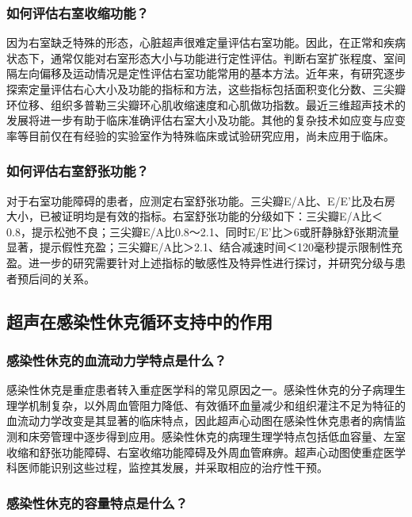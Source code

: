 \subsubsection{如何评估右室收缩功能？}

因为右室缺乏特殊的形态，心脏超声很难定量评估右室功能。因此，在正常和疾病状态下，通常仅能对右室形态大小与功能进行定性评估。判断右室扩张程度、室间隔左向偏移及运动情况是定性评估右室功能常用的基本方法。近年来，有研究逐步探索定量评估右心大小及功能的指标和方法，这些指标包括面积变化分数、三尖瓣环位移、组织多普勒三尖瓣环心肌收缩速度和心肌做功指数。最近三维超声技术的发展将进一步有助于临床准确评估右室大小及功能。其他的复杂技术如应变与应变率等目前仅在有经验的实验室作为特殊临床或试验研究应用，尚未应用于临床。

\subsubsection{如何评估右室舒张功能？}

对于右室功能障碍的患者，应测定右室舒张功能。三尖瓣E/A比、E/E'比及右房大小，已被证明均是有效的指标。右室舒张功能的分级如下：三尖瓣E/A比＜0.8，提示松弛不良；三尖瓣E/A比0.8～2.1、同时E/E'比＞6或肝静脉舒张期流量显著，提示假性充盈；三尖瓣E/A比＞2.1、结合减速时间＜120毫秒提示限制性充盈。进一步的研究需要针对上述指标的敏感性及特异性进行探讨，并研究分级与患者预后间的关系。

\subsection{超声在感染性休克循环支持中的作用}

\subsubsection{感染性休克的血流动力学特点是什么？}

感染性休克是重症患者转入重症医学科的常见原因之一。感染性休克的分子病理生理学机制复杂，以外周血管阻力降低、有效循环血量减少和组织灌注不足为特征的血流动力学改变是其显著的临床特点，因此超声心动图在感染性休克患者的病情监测和床旁管理中逐步得到应用。感染性休克的病理生理学特点包括低血容量、左室收缩和舒张功能障碍、右室收缩功能障碍及外周血管麻痹。超声心动图使重症医学科医师能识别这些过程，监控其发展，并采取相应的治疗性干预。

\subsubsection{感染性休克的容量特点是什么？}

